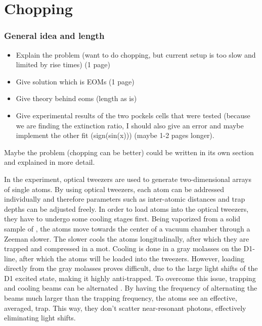 \chapter{Chopping}
\label{ch:chopping}

\subsection*{General idea and length}
\begin{itemize}
	\item Explain the problem (want to do chopping, but current setup is too slow and limited by rise times) (1 page)
	\item Give solution which is EOMs (1 page)
	\item Give theory behind eoms (length as is)
	\item Give experimental results of the two pockels cells that were tested (because we are finding the extinction ratio, I should also give an error and maybe implement the other fit (sign(sin(x))) (maybe 1-2 pages longer).
\end{itemize}
Maybe the problem (chopping can be better) could be written in its own section and explained in more detail.

In the experiment, optical tweezers are used to generate two-dimensional arrays of single atoms. By using optical tweezers, each atom can be addressed individually and therefore parameters such as inter-atomic distances and trap depths can be adjusted freely. In order to load atoms into the optical tweezers, they have to undergo some cooling stages first. Being vaporized from a solid sample of , the atoms move towards the center of a vacuum chamber through a Zeeman slower. The slower cools the atoms longitudinally, after which they are trapped and compressed in a \ac{mot}. Cooling is done in a gray molasses on the D1-line, after which the atoms will be loaded into the tweezers. However, loading directly from the gray molasses proves difficult, due to the large light shifts of the D1 excited state, making it highly anti-trapped. To overcome this issue, trapping and cooling beams can be alternated \cite{Hutzler2017}. By having the frequency of alternating the beams much larger than the trapping frequency, the atoms see an effective, averaged, trap. This way, they don't scatter near-resonant photons, effectively eliminating light shifts.

